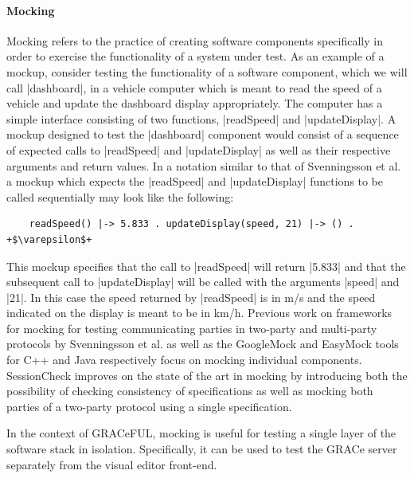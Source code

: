 \documentclass{article}
\begin{document}
\paragraph{Mocking}

Mocking refers to the practice of creating software components specifically
in order to exercise the functionality of a system under test.
%
As an example of a mockup, consider testing the functionality of a software
component, which we will call |dashboard|, in a vehicle computer which is
meant to read the speed of a vehicle and update the dashboard display
appropriately.
%
The computer has a simple interface consisting of two functions,
|readSpeed| and |updateDisplay|.
%
A mockup designed to test the |dashboard| component would consist of a sequence
of expected calls to |readSpeed| and |updateDisplay| as well as their
respective arguments and return values.
%
In a notation similar to that of Svenningsson et al. \cite{HughesMocking}
a mockup which expects the |readSpeed| and |updateDisplay| functions to be
called sequentially may look like the following:
%
\begin{verbatim}
    readSpeed() |-> 5.833 . updateDisplay(speed, 21) |-> () . +$\varepsilon$+
\end{verbatim}
%
This mockup specifies that the call to |readSpeed| will return |5.833| and that
the subsequent call to |updateDisplay| will be called with the arguments
|speed| and |21|.
%
In this case the speed returned by |readSpeed| is in m/s and the speed indicated
on the display is meant to be in km/h.
%
Previous work on frameworks for mocking for testing communicating parties
in two-party and multi-party protocols by Svenningsson et al. \cite{HughesMocking}
as well as the GoogleMock \cite{GoogleMock} and EasyMock \cite{EasyMock} tools
for C++ and Java respectively focus on mocking individual components.
%
SessionCheck improves on the state of the art in mocking by introducing
both the possibility of checking consistency of specifications as well as
mocking both parties of a two-party protocol using a single specification.
%

In the context of GRACeFUL, mocking is useful for testing a single
layer of the software stack in isolation.
%
Specifically, it can be used to test the GRACe server separately from
the visual editor front-end.
\end{document}
